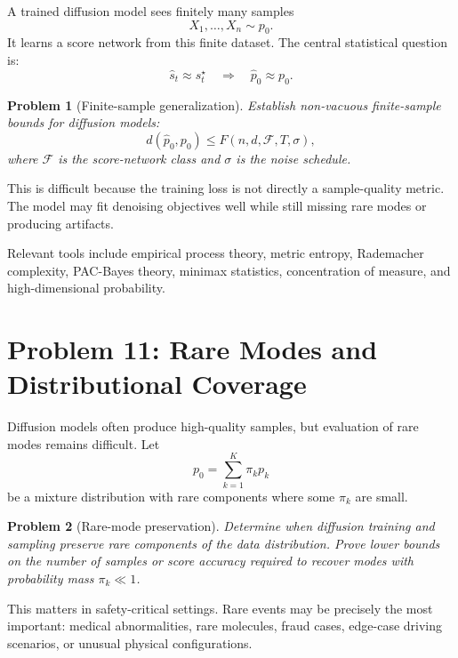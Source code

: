 \documentclass[11pt]{article}
\newtheorem{problem}{Problem}
\begin{document}
A trained diffusion model sees finitely many samples
\begin{equation}
X_1,\dots,X_n \sim p_0.
\end{equation}
It learns a score network from this finite dataset. The central statistical question is:
\begin{equation}
\widehat{s}_t \approx s_t^\star
\quad \Longrightarrow \quad
\widehat{p}_0 \approx p_0.
\end{equation}

\begin{problem}[Finite-sample generalization]
Establish non-vacuous finite-sample bounds for diffusion models:
\begin{equation}
d(\widehat{p}_0,p_0)
\leq
F(n,d,\mathcal{F},T,\sigma),
\end{equation}
where $\mathcal{F}$ is the score-network class and $\sigma$ is the noise schedule.
\end{problem}

This is difficult because the training loss is not directly a sample-quality metric. The model may fit denoising objectives well while still missing rare modes or producing artifacts.

Relevant tools include empirical process theory, metric entropy, Rademacher complexity, PAC-Bayes theory, minimax statistics, concentration of measure, and high-dimensional probability.

\section{Problem 11: Rare Modes and Distributional Coverage}

Diffusion models often produce high-quality samples, but evaluation of rare modes remains difficult. Let
\begin{equation}
p_0 = \sum_{k=1}^K \pi_k p_k
\end{equation}
be a mixture distribution with rare components where some $\pi_k$ are small.

\begin{problem}[Rare-mode preservation]
Determine when diffusion training and sampling preserve rare components of the data distribution. Prove lower bounds on the number of samples or score accuracy required to recover modes with probability mass $\pi_k \ll 1$.
\end{problem}

This matters in safety-critical settings. Rare events may be precisely the most important: medical abnormalities, rare molecules, fraud cases, edge-case driving scenarios, or unusual physical configurations.
\end{document}
